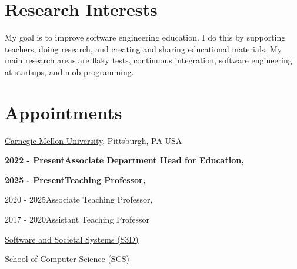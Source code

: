\documentclass[10pt]{article}
\begin{document}

% 
\thispagestyle{empty}
\section{Research Interests}
My goal is to improve software engineering education.  I do this by supporting teachers, doing research, and creating and sharing educational materials. My main research areas are flaky tests, continuous integration, software engineering at startups, and mob programming.
 
%



\section{Appointments}

 \href{https://www.cmu.edu/}{Carnegie Mellon University},
Pittsburgh, PA USA

\textbf{2022 - Present\qquad Associate Department Head for Education,}

\textbf{2025 - Present\qquad Teaching Professor, }

2020 - 2025\qquad Associate Teaching Professor, 


2017 - 2020\qquad Assistant Teaching Professor

\href{https://s3d.cmu.edu/}{Software and Societal Systems (S3D)}

\href{https://www.cs.cmu.edu/}{School of Computer Science (SCS)}    
\end{document}

